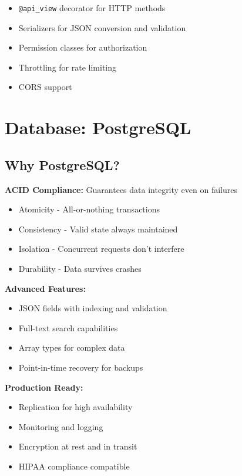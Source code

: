 \documentclass[11pt,a4paper,twoside]{report}
\begin{document}
\begin{itemize}
    \item \texttt{@api\_view} decorator for HTTP methods
    \item Serializers for JSON conversion and validation
    \item Permission classes for authorization
    \item Throttling for rate limiting
    \item CORS support
\end{itemize}

\section{Database: PostgreSQL}

\subsection{Why PostgreSQL?}

\textbf{ACID Compliance:} Guarantees data integrity even on failures
\begin{itemize}
    \item Atomicity - All-or-nothing transactions
    \item Consistency - Valid state always maintained
    \item Isolation - Concurrent requests don't interfere
    \item Durability - Data survives crashes
\end{itemize}

\textbf{Advanced Features:}
\begin{itemize}
    \item JSON fields with indexing and validation
    \item Full-text search capabilities
    \item Array types for complex data
    \item Point-in-time recovery for backups
\end{itemize}

\textbf{Production Ready:}
\begin{itemize}
    \item Replication for high availability
    \item Monitoring and logging
    \item Encryption at rest and in transit
    \item HIPAA compliance compatible
\end{itemize}
\end{document}
